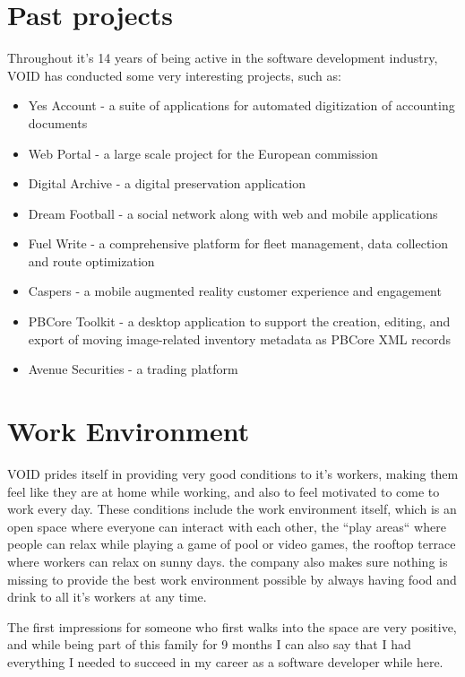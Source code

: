 \section{Past projects}

Throughout it's 14 years of being active in the software development industry, VOID has conducted some very interesting projects, such as:
\begin{itemize}
 \item Yes Account - a suite of applications for automated digitization of accounting documents
 \item Web Portal - a large scale project for the European commission
 \item Digital Archive - a digital preservation application
 \item Dream Football - a social network along with web and mobile applications 
 \item Fuel Write - a comprehensive platform for fleet management, data collection and route optimization
 \item Caspers - a mobile augmented reality customer experience and engagement
 \item PBCore Toolkit - a desktop application to support the creation, editing, and export of moving image-related inventory metadata as PBCore XML records
 \item Avenue Securities - a trading platform
\end{itemize}

\section{Work Environment}

VOID prides itself in providing very good conditions to it's workers, making them feel like they are at home while working,
and also to feel motivated to come to work every day. These conditions include the work environment itself, which is an open space where 
everyone can interact with each other, the ``play areas`` where people can relax while playing a game of pool or video games, the rooftop terrace where workers can relax on sunny days.
the company also makes sure nothing is missing to provide the best work environment possible by always having food and drink to all it's workers at any time.

The first impressions for someone who first walks into the space are very positive, and while being part of this family for 9 months I can also say that I had everything 
I needed to succeed in my career as a software developer while here.
